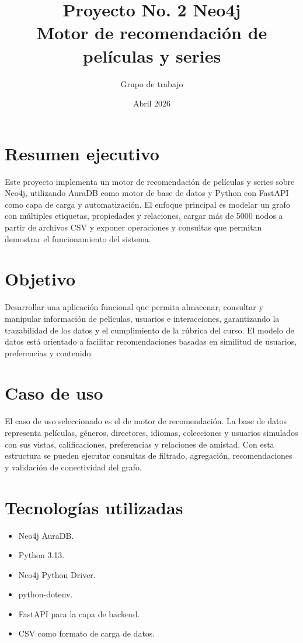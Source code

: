 \documentclass[12pt,a4paper]{article}
\title{Proyecto No. 2 Neo4j\\\large Motor de recomendación de películas y series}
\author{Grupo de trabajo}
\date{Abril 2026}
\begin{document}
\maketitle
\tableofcontents
\newpage

\section{Resumen ejecutivo}

Este proyecto implementa un motor de recomendación de películas y series sobre Neo4j, utilizando AuraDB como motor de base de datos y Python con FastAPI como capa de carga y automatización. El enfoque principal es modelar un grafo con múltiples etiquetas, propiedades y relaciones, cargar más de 5000 nodos a partir de archivos CSV y exponer operaciones y consultas que permitan demostrar el funcionamiento del sistema.

\section{Objetivo}

Desarrollar una aplicación funcional que permita almacenar, consultar y manipular información de películas, usuarios e interacciones, garantizando la trazabilidad de los datos y el cumplimiento de la rúbrica del curso. El modelo de datos está orientado a facilitar recomendaciones basadas en similitud de usuarios, preferencias y contenido.

\section{Caso de uso}

El caso de uso seleccionado es el de motor de recomendación. La base de datos representa películas, géneros, directores, idiomas, colecciones y usuarios simulados con sus vistas, calificaciones, preferencias y relaciones de amistad. Con esta estructura se pueden ejecutar consultas de filtrado, agregación, recomendaciones y validación de conectividad del grafo.

\section{Tecnologías utilizadas}

\begin{itemize}
    \item Neo4j AuraDB.
    \item Python 3.13.
    \item Neo4j Python Driver.
    \item python-dotenv.
    \item FastAPI para la capa de backend.
    \item CSV como formato de carga de datos.
\end{itemize}
\end{document}
